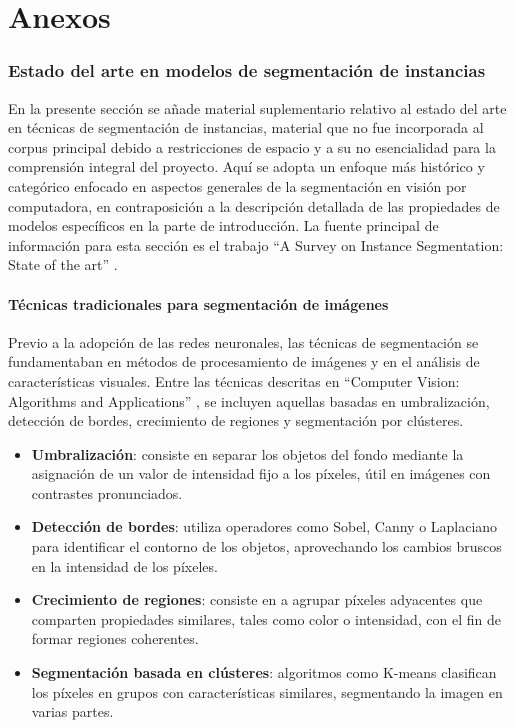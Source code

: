\part*{Anexos}
\label{part:anexo}
\section{Estado del arte en modelos de segmentación de instancias}
En la presente sección se añade material suplementario relativo al estado del arte en técnicas de segmentación de instancias, material que no fue incorporada al corpus principal debido a restricciones de espacio y a su no esencialidad para la comprensión integral del proyecto. Aquí se adopta un enfoque más histórico y categórico enfocado en aspectos generales de la segmentación en visión por computadora, en contraposición a la descripción detallada de las propiedades de modelos específicos en la parte de introducción. La fuente principal de información para esta sección es el trabajo \enquote{A Survey on Instance Segmentation: State of the art} \cite[Hafiz y Bhat 2020]{Hafiz2020}.

\subsection{Técnicas tradicionales para segmentación de imágenes}
Previo a la adopción de las redes neuronales, las técnicas de segmentación se fundamentaban en métodos de procesamiento de imágenes y en el análisis de características visuales. Entre las técnicas descritas en \enquote{Computer Vision: Algorithms and Applications} \cite[Szeliski 2022]{Szeliski2022}, se incluyen aquellas basadas en umbralización, detección de bordes, crecimiento de regiones y segmentación por clústeres.

\begin{itemize}
\setlength\itemsep{-0.3em}
    \item \textbf{Umbralización}: consiste en separar los objetos del fondo mediante la asignación de un valor de intensidad fijo a los píxeles, útil en imágenes con contrastes pronunciados.
    \item \textbf{Detección de bordes}: utiliza operadores como Sobel, Canny o Laplaciano para identificar el contorno de los objetos, aprovechando los cambios bruscos en la intensidad de los píxeles.
    \item \textbf{Crecimiento de regiones}: consiste en a agrupar píxeles adyacentes que comparten propiedades similares, tales como color o intensidad, con el fin de formar regiones coherentes.
    \item \textbf{Segmentación basada en clústeres}: algoritmos como K-means clasifican los píxeles en grupos con características similares, segmentando la imagen en varias partes.
\end{itemize}

